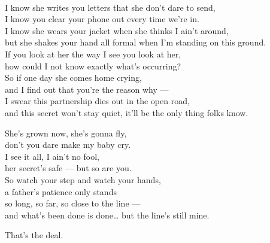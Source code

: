 \begin{lyrics}
\\
I know she writes you letters that she don't dare to send,\\
I know you clear your phone out every time we're in.\\
I know she wears your jacket when she thinks I ain't around,\\
but she shakes your hand all formal when I'm standing on this ground.\\
If you look at her the way I see you look at her,\\
how could I not know exactly what's occurring?\\
So if one day she comes home crying,\\
and I find out that you're the reason why —\\
I swear this partnership dies out in the open road,\\
and this secret won't stay quiet, it'll be the only thing folks know.

She's grown now, she's gonna fly,\\
don't you dare make my baby cry.\\
I see it all, I ain't no fool,\\
her secret's safe — but so are you.\\
So watch your step and watch your hands,\\
a father's patience only stands\\
so long, so far, so close to the line —\\
and what's been done is done… but the line's still mine.

 That's the deal.
\end{lyrics}


